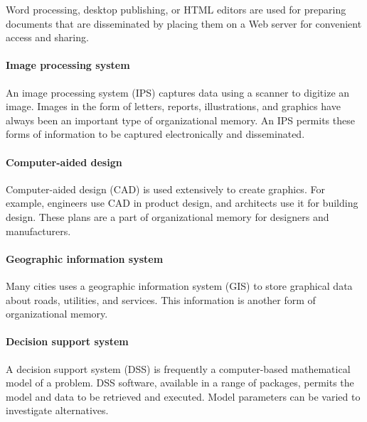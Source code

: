 \documentclass[
]{article}
\begin{document}
Word processing, desktop publishing, or HTML editors are used for
preparing documents that are disseminated by placing them on a Web
server for convenient access and sharing.

\hypertarget{image-processing-system}{%
\paragraph*{Image processing system}\label{image-processing-system}}

An image processing system (IPS) captures data using a scanner to
digitize an image. Images in the form of letters, reports,
illustrations, and graphics have always been an important type of
organizational memory. An IPS permits these forms of information to be
captured electronically and disseminated.

\hypertarget{computer-aided-design}{%
\paragraph*{Computer-aided design}\label{computer-aided-design}}

Computer-aided design (CAD) is used extensively to create graphics. For
example, engineers use CAD in product design, and architects use it for
building design. These plans are a part of organizational memory for
designers and manufacturers.

\hypertarget{geographic-information-system}{%
\paragraph*{Geographic information system}\label{geographic-information-system}}

Many cities uses a geographic information system (GIS) to store
graphical data about roads, utilities, and services. This information is
another form of organizational memory.

\hypertarget{decision-support-system}{%
\paragraph*{Decision support system}\label{decision-support-system}}

A decision support system (DSS) is frequently a computer-based
mathematical model of a problem. DSS software, available in a range of
packages, permits the model and data to be retrieved and executed. Model
parameters can be varied to investigate alternatives.
\end{document}
